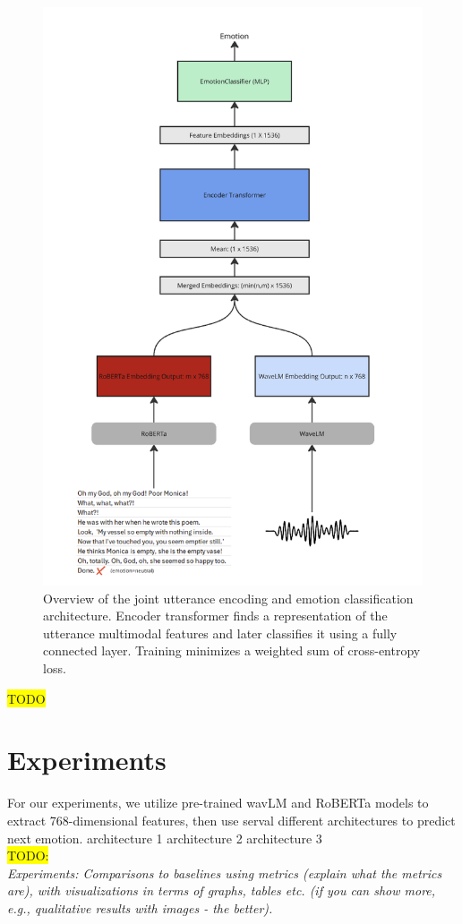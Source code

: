 \documentclass{article}
\begin{document}
\begin{figure}
  \centering
  \includegraphics[width=0.8\linewidth]{Images/transformer_encoder.png}
  \caption{Overview of the joint utterance encoding and emotion classification architecture. Encoder transformer finds a representation of the utterance multimodal features and later classifies it using a fully connected layer. Training minimizes a weighted sum of cross-entropy loss.}
  \label{fig:transf-dec}
\end{figure}

\colorbox{yellow}{TODO}\\


\section{Experiments}
For our experiments, we utilize pre-trained wavLM and RoBERTa
models to extract 768-dimensional features, then use serval different architectures to predict next emotion.
architecture 1
architecture 2
architecture 3
\\ \colorbox{yellow}{TODO:}\\
\textit{Experiments: Comparisons to baselines using metrics (explain what the metrics are), with visualizations in terms of graphs, tables etc. (if you can show more, e.g., qualitative results with images - the better).}\\
\end{document}
